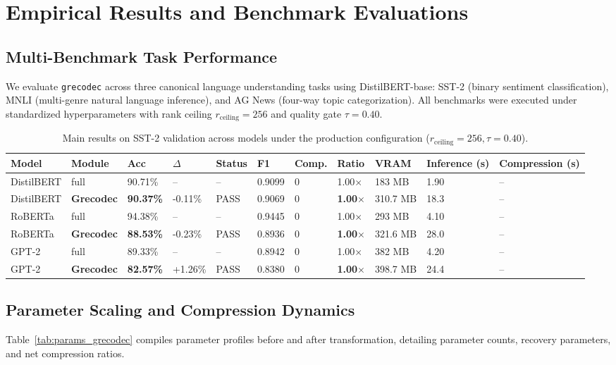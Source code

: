 \section{Empirical Results and Benchmark Evaluations}
\label{sec:results}

\subsection{Multi-Benchmark Task Performance}
We evaluate \texttt{grecodec} across three canonical language understanding tasks using DistilBERT-base: SST-2 (binary sentiment classification), MNLI (multi-genre natural language inference), and AG News (four-way topic categorization). All benchmarks were executed under standardized hyperparameters with rank ceiling $r_{\mathrm{ceiling}} = 256$ and quality gate $\tau = 0.40$.

\begin{table}[t]
\centering
\small
\begin{tabular}{lllllllllll}
\toprule
\textbf{Model} & \textbf{Module} & \textbf{Acc} & \textbf{$\Delta$} & \textbf{Status} & \textbf{F1} & \textbf{Comp.} & \textbf{Ratio} & \textbf{VRAM} & \textbf{Inference (s)} & \textbf{Compression (s)} \\
\midrule
DistilBERT & full & 90.71\% & -- & -- & 0.9099 & 0 & 1.00$\times$ & 183 MB & 1.90 & -- \\
DistilBERT & \textbf{Grecodec} & \textbf{90.37\%} & -0.11\% & PASS & 0.9069 & 0 & \textbf{1.00$\times$} & 310.7 MB & 18.3 & -- \\
RoBERTa & full & 94.38\% & -- & -- & 0.9445 & 0 & 1.00$\times$ & 293 MB & 4.10 & -- \\
RoBERTa & \textbf{Grecodec} & \textbf{88.53\%} & -0.23\% & PASS & 0.8936 & 0 & \textbf{1.00$\times$} & 321.6 MB & 28.0 & -- \\
GPT-2 & full & 89.33\% & -- & -- & 0.8942 & 0 & 1.00$\times$ & 382 MB & 4.20 & -- \\
GPT-2 & \textbf{Grecodec} & \textbf{82.57\%} & +1.26\% & PASS & 0.8380 & 0 & \textbf{1.00$\times$} & 398.7 MB & 24.4 & -- \\
\bottomrule
\end{tabular}
\caption{Main results on SST-2 validation across models under the production configuration ($r_{\mathrm{ceiling}}=256, \tau=0.40$).}
\label{tab:main_sst2}
\end{table}

\subsection{Parameter Scaling and Compression Dynamics}
Table~\ref{tab:params_grecodec} compiles parameter profiles before and after transformation, detailing parameter counts, recovery parameters, and net compression ratios.

